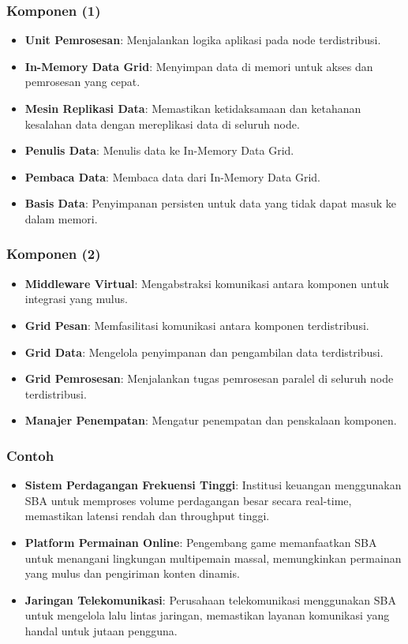 \documentclass[aspectratio=169, table]{beamer}
\begin{document}
    \begin{frame}
        \frametitle{Komponen (1)}
        \begin{itemize}
            \item \textbf{Unit Pemrosesan}: Menjalankan logika aplikasi pada node terdistribusi.
            \item \textbf{In-Memory Data Grid}: Menyimpan data di memori untuk akses dan pemrosesan yang cepat.
            \item \textbf{Mesin Replikasi Data}: Memastikan ketidaksamaan dan ketahanan kesalahan data dengan mereplikasi data di seluruh node.
            \item \textbf{Penulis Data}: Menulis data ke In-Memory Data Grid.
            \item \textbf{Pembaca Data}: Membaca data dari In-Memory Data Grid.
            \item \textbf{Basis Data}: Penyimpanan persisten untuk data yang tidak dapat masuk ke dalam memori.
        \end{itemize}
    \end{frame}

    \begin{frame}
        \frametitle{Komponen (2)}
        \begin{itemize}
            \item \textbf{Middleware Virtual}: Mengabstraksi komunikasi antara komponen untuk integrasi yang mulus.
            \item \textbf{Grid Pesan}: Memfasilitasi komunikasi antara komponen terdistribusi.
            \item \textbf{Grid Data}: Mengelola penyimpanan dan pengambilan data terdistribusi.
            \item \textbf{Grid Pemrosesan}: Menjalankan tugas pemrosesan paralel di seluruh node terdistribusi.
            \item \textbf{Manajer Penempatan}: Mengatur penempatan dan penskalaan komponen.
        \end{itemize}
    \end{frame}

    \begin{frame}
        \frametitle{Contoh}
        \begin{itemize}
            \item \textbf{Sistem Perdagangan Frekuensi Tinggi}: Institusi keuangan menggunakan SBA untuk memproses volume perdagangan besar secara real-time, memastikan latensi rendah dan throughput tinggi.
            \item \textbf{Platform Permainan Online}: Pengembang game memanfaatkan SBA untuk menangani lingkungan multipemain massal, memungkinkan permainan yang mulus dan pengiriman konten dinamis.
            \item \textbf{Jaringan Telekomunikasi}: Perusahaan telekomunikasi menggunakan SBA untuk mengelola lalu lintas jaringan, memastikan layanan komunikasi yang handal untuk jutaan pengguna.
        \end{itemize}
    \end{frame}
\end{document}
